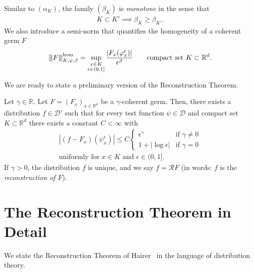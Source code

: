 Similar to \((\alpha_K)\), the family \((\beta_K)\) is \emph{monotone} in the sense that 
\begin{align}\label{beta-monotone}
    K \subset K' \implies \beta_K \geq \beta_{K'}.
\end{align} 
We also introduce a semi-norm that quantifies the homogeneity of a coherent germ \( F  \)
\begin{align}\label{definition:semi-norm-homogeneity}
    {\left\vert\kern-0.25ex\left\vert\kern-0.25ex\left\vert F \right\vert\kern-0.25ex\right\vert\kern-0.25ex\right\vert}^{\mathrm{\hom}}_{K, \varphi, \beta} = \sup_{\substack{x \in K \\ \epsilon \in (0,1]}} \frac{|F_x(\varphi^\epsilon_x)|}{\epsilon^\beta} \qquad \text{compact set \( K \subset \mathbb{R}^d \)}.
\end{align}


We are ready to state a preliminary version of the Reconstruction Theorem. 

\begin{theorem}\label{peek:prelim-reconstruction-theorem}
    Let \(\gamma \in \mathbb{R}\).
   Let \(F = {(F_x)}_{x \in \mathbb{R}^d}\) be a \(\gamma\)-coherent germ. Then, there exists a distribution \(f \in \mathcal{D}'\) such that for every test function \(\psi \in \mathcal{D}\) and compact set \(K \subset \mathbb{R}^d\) there exists a constant \(C < \infty\) with  
   \begin{gather*}
           |(f-F_x)(\psi^\epsilon_x)| \leq C \begin{cases}
                   \epsilon^\gamma \quad &\text{if \(\gamma \neq 0\)} \\
                   1+|\log\epsilon| & \text{if \(\gamma = 0\)}
           \end{cases} \\ \text{uniformly for \(x \in K\) and \(\epsilon \in (0,1]\)}.
   \end{gather*}
   If \(\gamma > 0\), the distribution \(f\) is unique, and we say \(f = \mathcal{R}F\) (in words: \(f\) is the \emph{reconstruction of \(F\)}).
\end{theorem}






\section{The Reconstruction Theorem in Detail}

We state the Reconstruction Theorem of Hairer~\cite{hairer2014theory} in the language of {distribution theory}.


